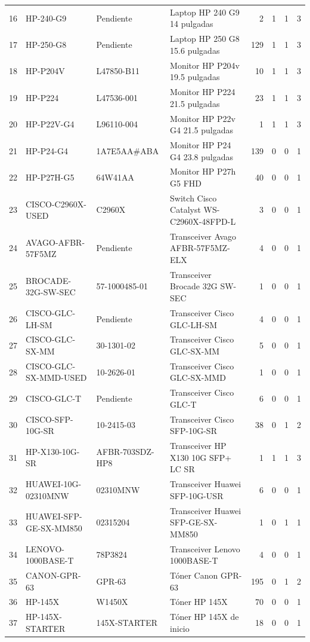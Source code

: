 \documentclass[11pt,a4paper]{article}
\begin{document}
\begin{landscape}
\begin{longtable}{r L{3.0cm} L{3.1cm} L{7.7cm} r r r r}
16 & HP-240-G9 & Pendiente & Laptop HP 240 G9 14 pulgadas & 2 & 1 & 1 & 3\\
17 & HP-250-G8 & Pendiente & Laptop HP 250 G8 15.6 pulgadas & 129 & 1 & 1 & 3\\
18 & HP-P204V & L47850-B11 & Monitor HP P204v 19.5 pulgadas & 10 & 1 & 1 & 3\\
19 & HP-P224 & L47536-001 & Monitor HP P224 21.5 pulgadas & 23 & 1 & 1 & 3\\
20 & HP-P22V-G4 & L96110-004 & Monitor HP P22v G4 21.5 pulgadas & 1 & 1 & 1 & 3\\
21 & HP-P24-G4 & 1A7E5AA\#ABA & Monitor HP P24 G4 23.8 pulgadas & 139 & 0 & 0 & 1\\
22 & HP-P27H-G5 & 64W41AA & Monitor HP P27h G5 FHD & 40 & 0 & 0 & 1\\
23 & CISCO-C2960X-USED & C2960X & Switch Cisco Catalyst WS-C2960X-48FPD-L & 3 & 0 & 0 & 1\\
24 & AVAGO-AFBR-57F5MZ & Pendiente & Transceiver Avago AFBR-57F5MZ-ELX & 4 & 0 & 0 & 1\\
25 & BROCADE-32G-SW-SEC & 57-1000485-01 & Transceiver Brocade 32G SW-SEC & 1 & 0 & 0 & 1\\
26 & CISCO-GLC-LH-SM & Pendiente & Transceiver Cisco GLC-LH-SM & 4 & 0 & 0 & 1\\
27 & CISCO-GLC-SX-MM & 30-1301-02 & Transceiver Cisco GLC-SX-MM & 5 & 0 & 0 & 1\\
28 & CISCO-GLC-SX-MMD-USED & 10-2626-01 & Transceiver Cisco GLC-SX-MMD & 1 & 0 & 0 & 1\\
29 & CISCO-GLC-T & Pendiente & Transceiver Cisco GLC-T & 6 & 0 & 0 & 1\\
30 & CISCO-SFP-10G-SR & 10-2415-03 & Transceiver Cisco SFP-10G-SR & 38 & 0 & 1 & 2\\
31 & HP-X130-10G-SR & AFBR-703SDZ-HP8 & Transceiver HP X130 10G SFP+ LC SR & 1 & 1 & 1 & 3\\
32 & HUAWEI-10G-02310MNW & 02310MNW & Transceiver Huawei SFP-10G-USR & 6 & 0 & 0 & 1\\
33 & HUAWEI-SFP-GE-SX-MM850 & 02315204 & Transceiver Huawei SFP-GE-SX-MM850 & 1 & 0 & 1 & 1\\
34 & LENOVO-1000BASE-T & 78P3824 & Transceiver Lenovo 1000BASE-T & 4 & 0 & 0 & 1\\
35 & CANON-GPR-63 & GPR-63 & Tóner Canon GPR-63 & 195 & 0 & 1 & 2\\
36 & HP-145X & W1450X & Tóner HP 145X & 70 & 0 & 0 & 1\\
37 & HP-145X-STARTER & 145X-STARTER & Tóner HP 145X de inicio & 18 & 0 & 0 & 1\\

\end{longtable}
\end{landscape}
\end{document}
